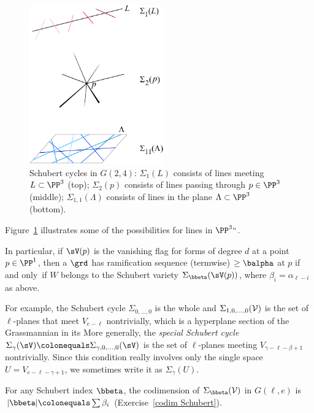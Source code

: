 \begin{figure}[b]
\centerline {\includegraphics[height=2.7in]{main/Fig12-2}}
\caption{
Schubert cycles in $G(2,4)$:
$\Sigma_{1}(L)$
consists of
lines meeting $L\subset\PP^3$
(top);
$\Sigma_{2}(p)$
consists of
lines passing through $p\in\PP^3$
(middle);
$\Sigma_{1,1}(\Lambda)$
consists of
 lines in the plane $\Lambda\subset
\PP^3$
(bottom).
}
\label{Schubert cycles in G(2,4)}
\end{figure}

Figure~\ref{Schubert cycles in G(2,4)} illustrates some of
the possibilities for lines in $\PP^3` `$.

In particular, if $\sV(p)$ is the vanishing flag for forms of degree $d$
at a point $p\in \PP^{1}$, then
a $\grd$ has ramification sequence (termwise) $\geq \balpha$ at $p$
%
if and only~if $W$ belongs
to the Schubert variety $\Sigma_{\bbeta}(\sV(p))$, where $\beta_{i} =
\alpha_{\ell-i}$ as above.

For example, the Schubert cycle $\Sigma_{0,\dots,0}$ is the whole
%
and $\Sigma_{1,0,\dots,0}(\cal V)$ is the set of $\ell$-planes that meet
$V_{e-\ell}$ nontrivially, which is
a hyperplane section of the Grassmannian in its 
%
More generally, the
\emph{special Schubert cycle}
%
%
$\Sigma_\gamma(\sV) \colonequals  \Sigma_{\gamma,0,\dots, 0}(\sV)$
is the set of $\ell$-planes
meeting  $V_{\gamma-\ell - \beta+1}$ nontrivially.
Since this condition really involves only the single space $U =
V_{e-\ell-\gamma+1}$, we sometimes
 write it
as $\Sigma_\gamma(U)$.

For any Schubert index $\bbeta$, the codimension of $\Sigma_{\bbeta}({\cal
V})$ in $G(\ell, e)$ is $|{\bbeta}|\colonequals  \sum \beta_i$
(Exercise~\ref{codim Schubert}).



